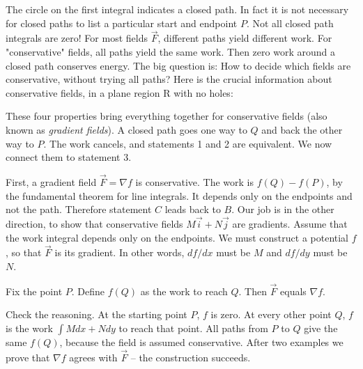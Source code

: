 {The circle on the first integral indicates a closed path. In fact it is not necessary for closed paths to list a particular start and endpoint $P$.
Not all closed path integrals are zero! For most fields $\vec F$, different paths yield
different work. For "conservative" fields, all paths yield the same work. Then zero 
work around a closed path conserves energy. The big question is: How to decide
which fields are conservative, without trying all paths? Here is the crucial information
about conservative fields, in a plane region R with no holes:

These four properties bring everything together for conservative fields (also known as \emph{gradient
fields}). A closed path goes one way to $Q$ and back the other way to $P$. The work
cancels, and statements 1 and 2 are equivalent. We now connect them to statement 3. 

First, a gradient field $\vec F = \nabla f$ is conservative. The work is $f(Q) - f(P)$, by the
fundamental theorem for line integrals. It depends only on the endpoints and not the
path. Therefore statement $C$ leads back to $B$.
Our job is in the other direction, to show that conservative fields $M\vec i + N\vec j$ are
gradients. Assume that the work integral depends only on the endpoints. We must
construct a potential $f$, so that $\vec F$ is its gradient. In other words, $df/dx$ must be $M$ and
$df/dy$ must be $N$.

Fix the point $P$. Define $f(Q)$ as the work to reach $Q$. Then $\vec F$ equals $\nabla f$.

Check the reasoning. At the starting point $P$, $f$ is zero. At every other point $Q$, $f$ is
the work $\int M dx + N dy$ to reach that point. All paths from $P$ to $Q$ give the same $f(Q)$,
because the field is assumed conservative. After two examples we prove that $\nabla f$
agrees with $\vec F$ -- the construction succeeds.

}
